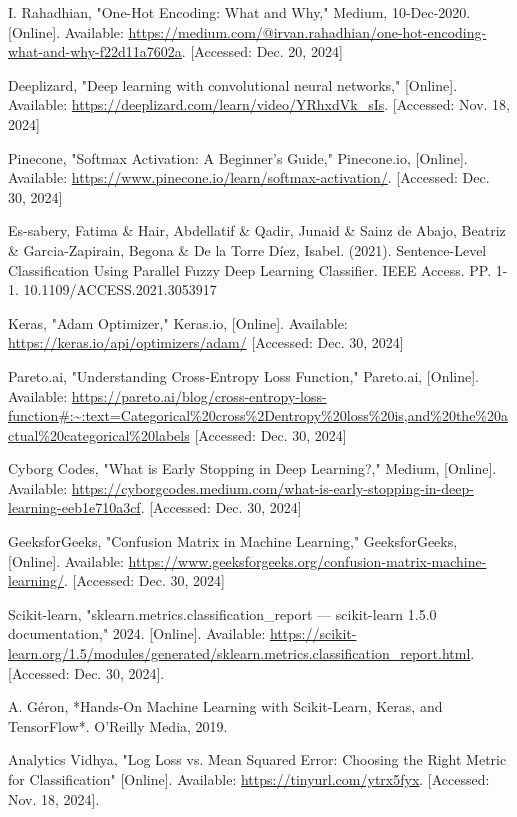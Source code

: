 \documentclass[conference]{IEEEtran}
\begin{document}
\begin{thebibliography}{00}
I. Rahadhian, "One-Hot Encoding: What and Why," Medium, 10-Dec-2020. [Online]. Available: \url{https://medium.com/@irvan.rahadhian/one-hot-encoding-what-and-why-f22d11a7602a}. [Accessed: Dec. 20, 2024]

 Deeplizard, "Deep learning with convolutional neural networks," [Online]. Available: \url{https://deeplizard.com/learn/video/YRhxdVk_sIs}. [Accessed: Nov. 18, 2024]

 Pinecone, "Softmax Activation: A Beginner's Guide," Pinecone.io, [Online]. Available: \url{https://www.pinecone.io/learn/softmax-activation/}. [Accessed: Dec. 30, 2024]

 Es-sabery, Fatima \& Hair, Abdellatif \& Qadir, Junaid \& Sainz de Abajo, Beatriz \& Garcia-Zapirain, Begona \& De la Torre Díez, Isabel. (2021). Sentence-Level Classification Using Parallel Fuzzy Deep Learning Classifier. IEEE Access. PP. 1-1. 10.1109/ACCESS.2021.3053917

 Keras, "Adam Optimizer," Keras.io, [Online]. Available: \url{https://keras.io/api/optimizers/adam/} [Accessed: Dec. 30, 2024]

 Pareto.ai, "Understanding Cross-Entropy Loss Function," Pareto.ai, [Online]. Available: \url{https://pareto.ai/blog/cross-entropy-loss-function\#:~:text=Categorical\%20cross\%2Dentropy\%20loss\%20is,and\%20the\%20actual\%20categorical\%20labels} [Accessed: Dec. 30, 2024]

 Cyborg Codes, "What is Early Stopping in Deep Learning?," Medium, [Online]. Available: \url{https://cyborgcodes.medium.com/what-is-early-stopping-in-deep-learning-eeb1e710a3cf}. [Accessed: Dec. 30, 2024]

 GeeksforGeeks, "Confusion Matrix in Machine Learning," GeeksforGeeks, [Online]. Available: \url{https://www.geeksforgeeks.org/confusion-matrix-machine-learning/}. [Accessed: Dec. 30, 2024]

 Scikit-learn, "sklearn.metrics.classification\_report — scikit-learn 1.5.0 documentation," 2024. [Online]. Available: \url{https://scikit-learn.org/1.5/modules/generated/sklearn.metrics.classification_report.html}. [Accessed: Dec. 30, 2024].

 A. Géron, *Hands-On Machine Learning with Scikit-Learn, Keras, and TensorFlow*. O'Reilly Media, 2019.

 Analytics Vidhya, "Log Loss vs. Mean Squared Error: Choosing the Right Metric for Classification" [Online]. Available: \url{https://tinyurl.com/ytrx5fyx}. [Accessed: Nov. 18, 2024].


\end{thebibliography}
\end{document}
